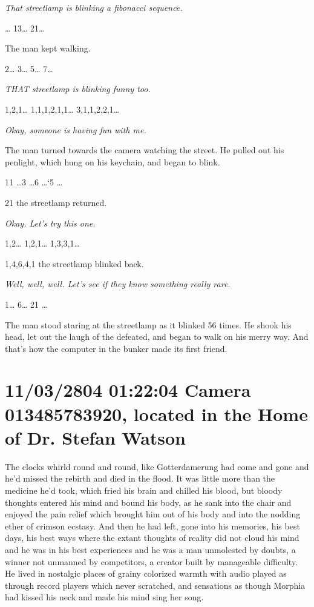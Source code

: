 \documentclass[12pt]{book}
\begin{document}
\emph{That streetlamp is blinking a fibonacci sequence.}

\ldots{} 13\ldots{} 21\ldots{}

The man kept walking.

2\ldots{} 3\ldots{} 5\ldots{} 7\ldots{}

\emph{THAT streetlamp is blinking funny too.}

1,2,1\ldots{} 1,1,1,2,1,1\ldots{} 3,1,1,2,2,1\ldots{}

\emph{Okay, someone is having fun with me.}

The man turned towards the camera watching the street. He pulled out his penlight, which hung on his keychain, and began to blink.

11 \ldots{}3 \ldots{}6 \ldots{}`5 \ldots{}

21 the streetlamp returned.

\emph{Okay. Let's try this one.}

1,2\ldots{} 1,2,1\ldots{} 1,3,3,1\ldots{}

1,4,6,4,1 the streetlamp blinked back.

\emph{Well, well, well. Let's see if they know something really rare.}

1\ldots{} 6\ldots{} 21 \ldots{}

The man stood staring at the streetlamp as it blinked 56 times. He shook his head, let out the laugh of the defeated, and began to walk on his merry way.
And that's how the computer in the bunker made its first friend.

\section*{11/03/2804 01:22:04 Camera 013485783920, located in the Home of Dr. Stefan Watson}
\label{sec:org85cec35}

The clocks whirld round and round, like Gotterdamerung had come and gone and he'd missed the rebirth and died in the flood. It was little more than the medicine he'd took, which fried his brain and chilled his blood, but bloody thoughts entered his mind and bound his body, as he sank into the chair and enjoyed the pain relief which brought him out of his body and into the nodding ether of crimson ecstasy. And then he had left, gone into his memories, his best days, his best ways where the extant thoughts of reality did not cloud his mind and he was in his best experiences and he was a man unmolested by doubts, a winner not unmanned by competitors, a creator built by manageable difficulty. He lived in nostalgic places of grainy colorized warmth with audio played as through record players which never scratched, and sensations as though Morphia had kissed his neck and made his mind sing her song.
\end{document}
